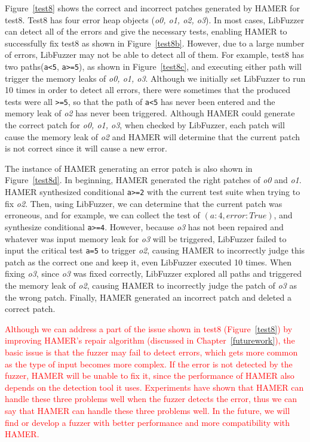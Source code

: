 \documentclass[a4paper,11pt,oneside,openany]{book}
\begin{document}
Figure~\ref{test8} shows the correct and incorrect patches generated by HAMER for test8. Test8 has four error heap objects ({\it o0, o1, o2, o3}). In most cases, LibFuzzer can detect all of the errors and give the necessary tests, enabling HAMER to successfully fix test8 as shown in Figure~\ref{test8b}. However, due to a large number of errors, LibFuzzer may not be able to detect all of them. For example, test8 has two paths(\verb|a<5|, \verb|a>=5|), as shown in Figure~\ref{test8c}, and executing either path will trigger the memory leaks of {\it o0, o1, o3}. Although we initially set LibFuzzer to run 10 times in order to detect all errors, there were sometimes that the produced tests were all \verb|>=5|, so that the path of \verb|a<5| has never been entered and the memory leak of {\it o2} has never been triggered. Although HAMER could generate the correct patch for {\it o0, o1, o3}, when checked by LibFuzzer, each patch will cause the memory leak of {\it o2} and HAMER will determine that the current patch is not correct since it will cause a new error.

The instance of HAMER generating an error patch is also shown in Figure~\ref{test8d}. In beginning, HAMER generated the right patches of {\it o0} and {\it o1}. HAMER synthesized conditional \verb|a>=2| with the current test suite when trying to fix {\it o2}. Then, using LibFuzzer, we can determine that the current patch was erroneous, and for example, we can collect the test of $(a: 4, error: True)$, and synthesize conditional \verb|a>=4|. However, because {\it o3} has not been repaired and whatever was input memory leak for {\it o3} will be triggered, LibFuzzer failed to input the critical test \verb|a=5| to trigger {\it o2}, causing HAMER to incorrectly judge this patch as the correct one and keep it, even LibFuzzer executed 10 times. When fixing {\it o3}, since {\it o3} was fixed correctly, LibFuzzer explored all paths and triggered the memory leak of {\it o2}, causing HAMER to incorrectly judge the patch of {\it o3} as the wrong patch. Finally, HAMER generated an incorrect patch and deleted a correct patch.

\textcolor{red}{Although we can address a part of the issue shown in test8 (Figure~\ref{test8}) by improving HAMER's repair algorithm (discussed in Chapter~\ref{futurework}), the basic issue is that the fuzzer may fail to detect errors, which gets more common as the type of input becomes more complex. If the error is not detected by the fuzzer, HAMER will be unable to fix it, since the performance of HAMER also depends on the detection tool it uses. Experiments have shown that HAMER can handle these three problems well when the fuzzer detects the error, thus we can say that HAMER can handle these three problems well. In the future, we will find or develop a fuzzer with better performance and more compatibility with HAMER.}
\end{document}
